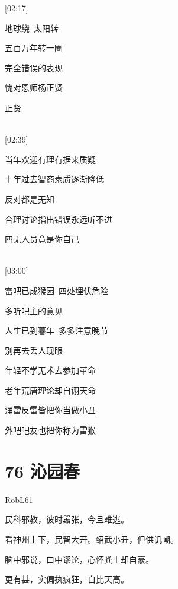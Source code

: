 \documentclass[UTF8,12pt,oneside]{ctexbook}
\def\pau#1{\begin{center} {#1} \end{center}} %
\def\pst#1{\begin{center}\Large \kaishu {#1} \songti \large \end{center}}%
\def\poemwithst#1#2#3{\section{#1}\pst{#2}\pau{#3}} %
\def\lid{\setlength\parindent{5em}}
\begin{document}
\begin{center}
            [02:17]
            
            地球绕\ 太阳转
            
            五百万年转一圈
            
            完全错误的表现
            
            愧对恩师杨正贤
            
            正贤
            
            ~\\
            
            [02:39]
            
            当年欢迎有理有据来质疑
            
            十年过去智商素质逐渐降低
            
            反对都是无知
            
            合理讨论指出错误永远听不进
            
            四无人员竟是你自己
            
            ~\\
            
            [03:00]
            
            雷吧已成猴园\ 四处埋伏危险
            
            多听吧主的意见
            
            人生已到暮年\ 多多注意晚节
            
            别再去丢人现眼
            
            年轻不学无术去参加革命
            
            老年荒唐理论却自诩天命
            
            涌雷反雷皆把你当做小丑
            
            外吧吧友也把你称为雷猴
        \end{center}

            \newpage

        \poemwithst{76 沁园春}{小改咏雷版}{RobL61} %
        
        \lid
        
        民科邪教，彼时嚣张，今且难逃。
        
        看神州上下，民智大开。绍武小丑，但供讥嘲。
        
        脑中邪说，口中谬论，心怀粪土却自豪。
        
        更有甚，实偏执疯狂，自比天高。 
        ~\\
        
\end{document}
